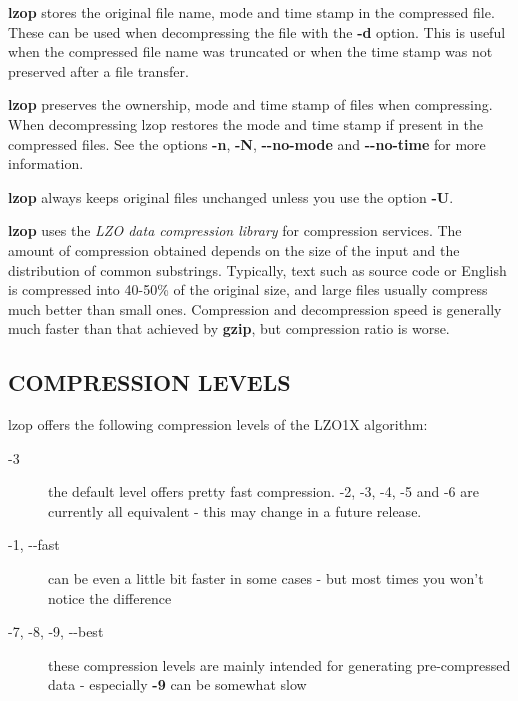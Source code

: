 \textbf{lzop} stores the original file name, mode and time stamp
in the compressed file. These can be used when
decompressing the file with the \textbf{-d} option. This is useful when
the compressed file name was truncated or when the time
stamp was not preserved after a file transfer.



\textbf{lzop} preserves the ownership, mode and time stamp of files
when compressing. When decompressing lzop restores the
mode and time stamp if present in the compressed files.
See the options \textbf{-n}, \textbf{-N}, \textbf{-{}-no-mode} and \textbf{-{}-no-time}
for more information.



\textbf{lzop} always keeps original files unchanged unless
you use the option \textbf{-U}.



\textbf{lzop} uses the \textit{LZO data compression library} for compression
services. The amount of compression obtained depends on
the size of the input and the distribution of common substrings.
Typically, text such as source code or English
is compressed into 40-50\% of the original size, and large files usually
compress much better than small ones. Compression and decompression speed
is generally much faster than that achieved by \textbf{gzip}, but
compression ratio is worse.

\subsection*{COMPRESSION LEVELS\label{COMPRESSION_LEVELS}}


lzop offers the following compression levels of the
LZO1X algorithm:

\begin{description}

\item[{-3}] \mbox{}

the default level offers pretty fast compression.
-2, -3, -4, -5 and -6 are currently all equivalent - this
may change in a future release.


\item[{-1, -{}-fast}] \mbox{}

can be even a little bit faster in some cases - but
most times you won't notice the difference


\item[{-7, -8, -9, -{}-best}] \mbox{}

these compression levels are mainly intended for generating
pre-compressed data - especially \textbf{-9} can be somewhat slow

\end{description}


